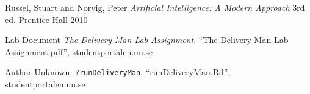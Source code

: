 \begin{thebibliography}{1}
   Russel, Stuart and Norvig, Peter \emph{Artificial Intelligence:
    A Modern Approach} 3rd ed. Prentice Hall 2010

   Lab Document \emph{The Delivery Man Lab Assignment},
    ``The Delivery Man Lab Assignment.pdf'', studentportalen.uu.se

   Author Unknown, \texttt{?runDeliveryMan},
    ``runDeliveryMan.Rd'', studentportalen.uu.se
\end{thebibliography}
